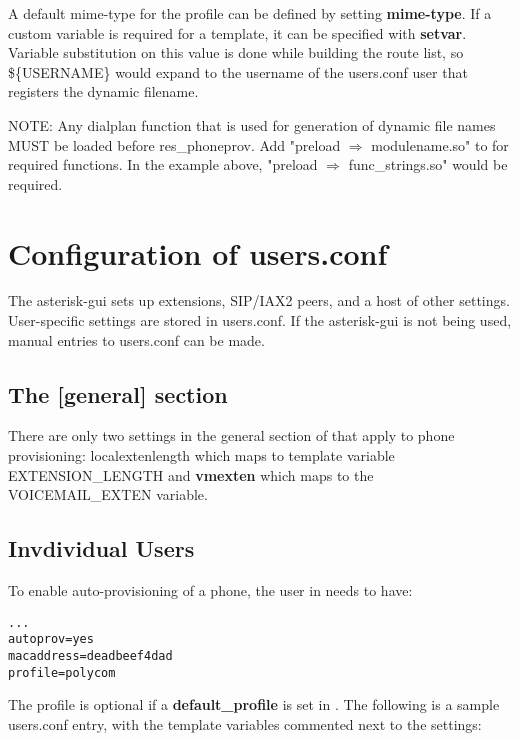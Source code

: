 A default mime-type for the profile can be defined by setting \textbf{mime-type}.  If a 
custom variable is required for a template, it can be specified with \textbf{setvar}. 
Variable substitution on this value is done while building the route list, so 
\$\{USERNAME\} would expand to the username of the users.conf user that registers the 
dynamic filename.

NOTE: Any dialplan function that is used for generation of dynamic file names MUST be 
loaded before res\_phoneprov. Add "preload $\Rightarrow$ modulename.so" to 
 for required functions. In the example above, "preload $\Rightarrow$ 
func\_strings.so" would be required.

\section{Configuration of users.conf}

The asterisk-gui sets up extensions, SIP/IAX2 peers, and a host of other settings. 
User-specific settings are stored in users.conf. If the asterisk-gui is not being used, 
manual entries to users.conf can be made.

\subsection{The [general] section}

There are only two settings in the general section of  that apply to 
phone provisioning: localextenlength which maps to template variable EXTENSION\_LENGTH 
and \textbf{vmexten} which maps to the VOICEMAIL\_EXTEN variable.

\subsection{Invdividual Users}

To enable auto-provisioning of a phone, the user in  needs to have:

\begin{astlisting}
\begin{verbatim}
...
autoprov=yes
macaddress=deadbeef4dad
profile=polycom
\end{verbatim}
\end{astlisting}

The profile is optional if a \textbf{default\_profile} is set in . 
The following is a sample users.conf entry, with the template variables commented next to 
the settings:

